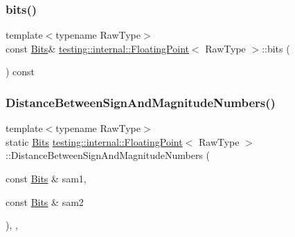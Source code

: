 \mbox{\label{classtesting_1_1internal_1_1FloatingPoint_aab053be914bdc9e507c0db89740c318c}} 
\subsubsection{\texorpdfstring{bits()}{bits()}}
{\footnotesize\ttfamily template$<$typename Raw\+Type$>$ \\
const \hyperlink{classtesting_1_1internal_1_1FloatingPoint_abf228bf6cd48f12c8b44c85b4971a731}{Bits}\& \hyperlink{classtesting_1_1internal_1_1FloatingPoint}{testing\+::internal\+::\+Floating\+Point}$<$ Raw\+Type $>$\+::bits (\begin{DoxyParamCaption}{ }\end{DoxyParamCaption}) const\hspace{0.3cm}{\ttfamily [inline]}}

\mbox{\label{classtesting_1_1internal_1_1FloatingPoint_afe00f9f26ad2929a061f7e07b8a5071a}} 
\subsubsection{\texorpdfstring{Distance\+Between\+Sign\+And\+Magnitude\+Numbers()}{DistanceBetweenSignAndMagnitudeNumbers()}}
{\footnotesize\ttfamily template$<$typename Raw\+Type$>$ \\
static \hyperlink{classtesting_1_1internal_1_1FloatingPoint_abf228bf6cd48f12c8b44c85b4971a731}{Bits} \hyperlink{classtesting_1_1internal_1_1FloatingPoint}{testing\+::internal\+::\+Floating\+Point}$<$ Raw\+Type $>$\+::Distance\+Between\+Sign\+And\+Magnitude\+Numbers (\begin{DoxyParamCaption}\item[{const \hyperlink{classtesting_1_1internal_1_1FloatingPoint_abf228bf6cd48f12c8b44c85b4971a731}{Bits} \&}]{sam1,  }\item[{const \hyperlink{classtesting_1_1internal_1_1FloatingPoint_abf228bf6cd48f12c8b44c85b4971a731}{Bits} \&}]{sam2 }\end{DoxyParamCaption})\hspace{0.3cm}{\ttfamily [inline]}, {\ttfamily [static]}, {\ttfamily [private]}}

